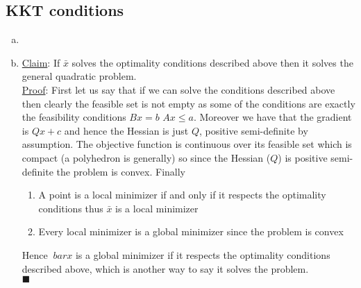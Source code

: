 \documentclass{article}
\begin{document}
\begin{enumerate}[a)]
		\section{KKT conditions}
		\begin{enumerate}[a)]
		\item
		\clearpage
		\item
		\underline{Claim}: If $\bar x$ solves the optimality conditions described above then it solves the general quadratic problem.\\
		\underline{Proof}: First let us say that if we can solve the conditions described above then clearly the feasible set is not empty as some of the conditions are exactly the feasibility conditions $Bx = b$ $Ax \leq a$. Moreover we have that the gradient is $Qx + c$ and hence the Hessian is just $Q$, positive semi-definite by assumption. The objective function is continuous over its feasible set which is compact (a polyhedron is generally) so since the Hessian ($Q$) is positive semi-definite the problem is convex. Finally
		\begin{enumerate}
			\item A point is a local  minimizer if and only if it respects the optimality conditions thus $\bar x$ is a local minimizer
			\item Every local minimizer is a global minimizer since the problem is convex
		\end{enumerate}
		Hence $\ bar x$ is a global minimizer if it respects the optimality conditions described above, which is another way to say it solves the problem.\\
		$\blacksquare$
		\end{enumerate}

	\end{enumerate}
\end{document}
